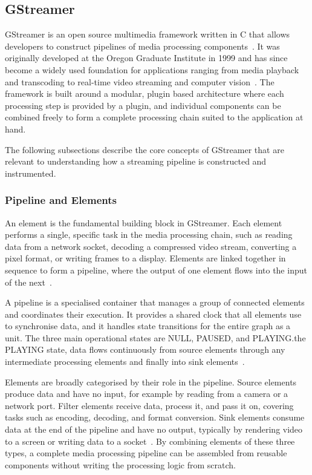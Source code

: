 \subsection{GStreamer}\label{sec:gstreamer}
GStreamer is an open source multimedia framework written in C that allows developers to construct pipelines of media processing components~\cite{gstreamer_intro}. It was originally developed at the Oregon Graduate Institute in 1999 and has since become a widely used foundation for applications ranging from media playback and transcoding to real-time video streaming and computer vision~\cite{gstreamer_intro}. The framework is built around a modular, plugin based architecture where each processing step is provided by a plugin, and individual components can be combined freely to form a complete processing chain suited to the application at hand.
 
The following subsections describe the core concepts of GStreamer that are relevant to understanding how a streaming pipeline is constructed and instrumented.

 
\subsubsection{Pipeline and Elements}\label{subsec:pipeline-elements}
An element is the fundamental building block in GStreamer. Each element performs a single, specific task in the media processing chain, such as reading data from a network socket, decoding a compressed video stream, converting a pixel format, or writing frames to a display. Elements are linked together in sequence to form a pipeline, where the output of one element flows into the input of the next~\cite{gstreamer_elements}.
 
A pipeline is a specialised container that manages a group of connected elements and coordinates their execution. It provides a shared clock that all elements use to synchronise data, and it handles state transitions for the entire graph as a unit. The three main operational states are NULL, PAUSED, and PLAYING.\@In the PLAYING state, data flows continuously from source elements through any intermediate processing elements and finally into sink elements~\cite{gstreamer_elements}.
 
Elements are broadly categorised by their role in the pipeline. Source elements produce data and have no input, for example by reading from a camera or a network port. Filter elements receive data, process it, and pass it on, covering tasks such as encoding, decoding, and format conversion. Sink elements consume data at the end of the pipeline and have no output, typically by rendering video to a screen or writing data to a socket~\cite{gstreamer_elements}. By combining elements of these three types, a complete media processing pipeline can be assembled from reusable components without writing the processing logic from scratch.

